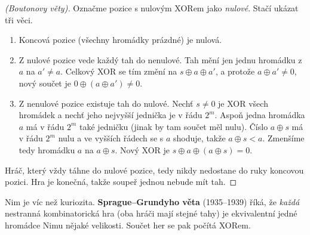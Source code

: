 \begin{center}
\end{center}

\begin{proof}[(Boutonovy věty)]
  Označme pozice s nulovým XORem jako \textit{nulové}. Stačí ukázat tři věci.
  \begin{enumerate}
    \item Koncová pozice (všechny hromádky prázdné) je nulová.
    \item Z nulové pozice vede každý tah do nenulové. Tah mění jen jednu hromádku z $a$ na $a' \neq a$. Celkový XOR se tím změní na $s\oplus a\oplus a'$, a protože $a\oplus a'\neq 0$, nový součet je $0\oplus(a\oplus a')\neq 0$.
    \item Z nenulové pozice existuje tah do nulové. Nechť $s\neq 0$ je XOR všech hromádek a nechť jeho nejvyšší jednička je v řádu $2^m$. Aspoň jedna hromádka $a$ má v řádu $2^m$ také jedničku (jinak by tam součet měl nulu). Číslo $a\oplus s$ má v řádu $2^m$ nulu a ve vyšších řádech se s $a$ shoduje, takže $a\oplus s < a$. Zmenšíme tedy hromádku $a$ na $a\oplus s$. Nový XOR je $s\oplus a\oplus(a\oplus s) = 0$.
  \end{enumerate}
  Hráč, který vždy táhne do nulové pozice, tedy nikdy nedostane do ruky koncovou pozici. Hra je konečná, takže soupeř jednou nebude mít tah.
\end{proof}

\begin{note}
  Nim je víc než kuriozita. \textbf{Sprague--Grundyho věta} (1935--1939) říká, že \textit{každá} nestranná kombinatorická hra (oba hráči mají stejné tahy) je ekvivalentní jedné hromádce Nimu nějaké velikosti. Součet her se pak počítá XORem.
\end{note}

